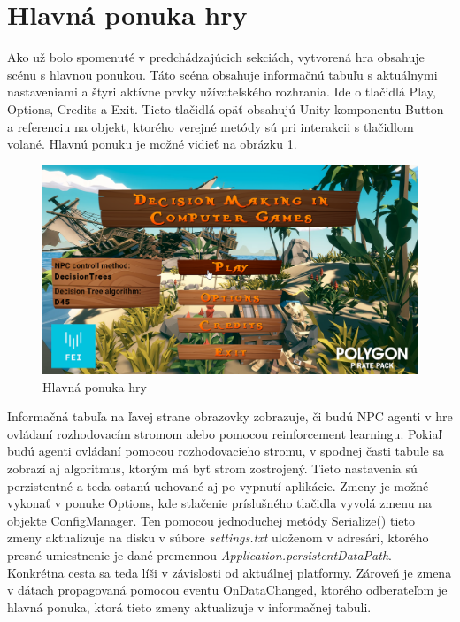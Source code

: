 \documentclass[slovak, master]{diploma}
\begin{document}
\section{Hlavná ponuka hry}
\label{sec:MainMenuAndUI}

Ako už bolo spomenuté v predchádzajúcich sekciách, vytvorená hra obsahuje scénu s hlavnou ponukou. Táto scéna obsahuje informačnú tabuľu s aktuálnymi nastaveniami a štyri aktívne prvky užívateľského rozhrania. Ide o tlačidlá Play, Options, Credits a Exit. Tieto tlačidlá opäť obsahujú Unity komponentu Button a referenciu na objekt, ktorého verejné metódy sú pri interakcii s tlačidlom volané. Hlavnú ponuku je možné vidieť na obrázku \ref{pic:MainMenu}.

\begin{figure}[!htbp]
    \centering
    \includegraphics[width=.9\textwidth]{Figures/mainMenu.png}
    \caption{Hlavná ponuka hry}
    \label{pic:MainMenu}
\end{figure}

Informačná tabuľa na ľavej strane obrazovky zobrazuje, či budú NPC agenti v hre ovládaní rozhodovacím stromom alebo pomocou reinforcement learningu. Pokiaľ budú agenti ovládaní pomocou rozhodovacieho stromu, v spodnej časti tabule sa zobrazí aj algoritmus, ktorým má byť strom zostrojený. Tieto nastavenia sú perzistentné a teda ostanú uchované aj po vypnutí aplikácie. Zmeny je možné vykonať v ponuke Options, kde stlačenie príslušného tlačidla vyvolá zmenu na objekte ConfigManager. Ten pomocou jednoduchej metódy Serialize() tieto zmeny aktualizuje na disku v súbore \textit{settings.txt} uloženom v adresári, ktorého presné umiestnenie je dané premennou \textit{Application.persistentDataPath}. Konkrétna cesta sa teda líši v závislosti od aktuálnej platformy. Zároveň je zmena v dátach propagovaná pomocou eventu OnDataChanged, ktorého odberateľom je hlavná ponuka, ktorá tieto zmeny aktualizuje v informačnej tabuli.
\end{document}
